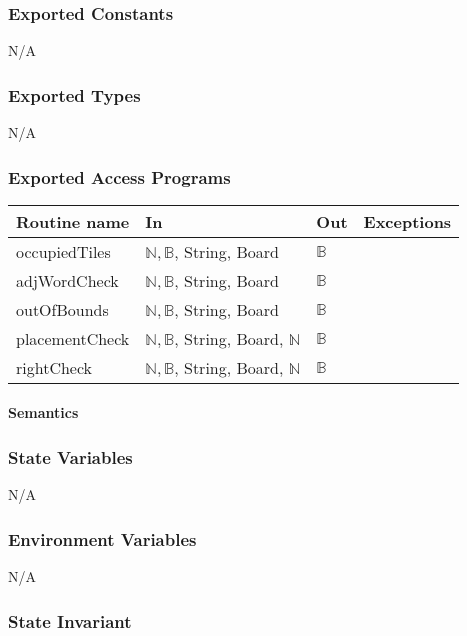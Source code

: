 \documentclass[12pt]{article}
\begin{document}
\subsubsection*{Exported Constants}
N/A
\subsubsection*{Exported Types}

N/A

\subsubsection* {Exported Access Programs}

\begin{tabular}{| l | l | l | l |}
\hline
\textbf{Routine name} & \textbf{In} & \textbf{Out} & \textbf{Exceptions}\\
\hline
occupiedTiles & $\mathbb{N}, \mathbb{B}$, String, Board & $\mathbb{B}$ & \\
\hline
adjWordCheck & $\mathbb{N}, \mathbb{B}$, String, Board & $\mathbb{B}$ & \\
\hline
outOfBounds & $\mathbb{N}, \mathbb{B}$, String, Board & $\mathbb{B}$ & \\
\hline
placementCheck & $\mathbb{N}, \mathbb{B}$, String, Board, $\mathbb{N}$ & $\mathbb{B}$ & \\
\hline
rightCheck & $\mathbb{N}, \mathbb{B}$, String, Board, $\mathbb{N}$ & $\mathbb{B}$ & \\
\hline
\end{tabular}

\paragraph* {Semantics}

\subsubsection*{State Variables}

N/A

\subsubsection*{Environment Variables}

N/A

\subsubsection*{State Invariant}
\end{document}
